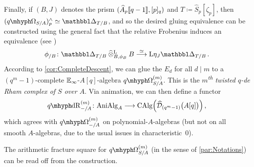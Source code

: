 \documentclass[DIV=12,numbers=enddot,leqno,bibliography=totoc]{scrartcl}
\begin{document}
\begin{numpar}
		Finally, if $(B,J)$ denotes the prism $(\widehat{A}_p\llbracket q-1\rrbracket,[p]_q)$ and $T\coloneqq \widehat{S}_p[\zeta_p]$, then $(\qOmega_{S/A})_p^\complete\simeq \Prism_{T/B}$, and so the desired gluing equivalence can be constructed using the general fact that the relative Frobenius 
		induces an equivalence (see \cite[Theorem~]{Prismatic})
		\begin{equation*}
			\phi_{/B}\colon\Prism_{T/B}\clotimes_{B,\phi_B}B\overset{\simeq}{\longrightarrow} \L\eta_J\Prism_{T/B}\,.
		\end{equation*}
		According to \cref{cor:CompleteDescent}, we can glue the $E_d$ for all $d\mid m$ to a $(q^m-1)$-complete $\mathbb{E}_\infty$-$A[q]$-algebra $\qOmega_{S/A}^{(m)}$. This is the \emph{$m$\textsuperscript{th} twisted $q$-de Rham complex of $S$ over $A$}. Via animation, we can then define a functor
		\begin{equation*}
			\qdeRham_{-/A}^{(m)}\colon \cat{AniAlg}_A\longrightarrow \CAlg\left(\widehat{\Dd}_{(q^m-1)}\bigl(A[q]\bigr)\right)\,,
		\end{equation*}
		which agrees with $\qOmega_{-/A}^{(m)}$ on polynomial-$A$-algebras (but not on all smooth $A$-algebras, due to the usual issues in characteristic~$0$). 
	\end{numpar}
	
	The arithmetic fracture square for $\qOmega_{S/A}^{(m)}$ (in the sense of %
	\cref{par:Notations}) can be read off from the construction.
	
\end{document}

